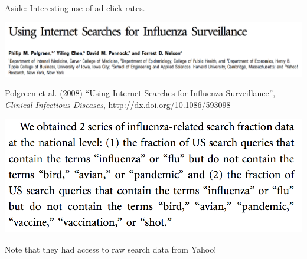 \documentclass[aspectratio=169]{beamer}
\def\vf{\vfill}
\begin{document}
\begin{frame}

{\Large
\begin{center}
Aside: Interesting use of ad-click rates.
\end{center}
}

\end{frame}
\begin{frame}

\begin{center}
\includegraphics[width=\textwidth]{figures/polgreen_using_2008_title}
\end{center}

\vf
Polgreen et al. (2008) ``Using Internet Searches for Influenza Surveillance'', \textit{Clinical Infectious Diseases}, \url{http://dx.doi.org/10.1086/593098}

\end{frame}
\begin{frame}

\begin{center}
\includegraphics[width=\textwidth]{figures/polgreen_using_2008_data}
\end{center}

\vf
Note that they had access to raw search data from Yahoo!

\end{frame}
\end{document}
